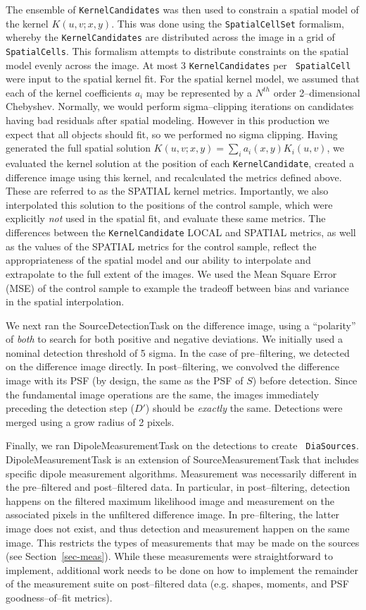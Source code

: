 \documentclass[prd, nofootinbib, floatfix, 11pt,tightenlines,times]{article}
\begin{document}
The ensemble of {\tt KernelCandidates} was then used to constrain a
spatial model of the kernel $K(u,v;x,y)$.  This was done using the
{\tt SpatialCellSet} formalism, whereby the {\tt KernelCandidates} are
distributed across the image in a grid of {\tt SpatialCells}.  This
formalism attempts to distribute constraints on the spatial model
evenly across the image.  At most 3 {\tt KernelCandidates} per {\tt
  SpatialCell} were input to the spatial kernel fit.  For the spatial
kernel model, we assumed that each of the kernel coefficients $a_i$
may be represented by a $N^{th}$ order 2--dimensional Chebyshev.
Normally, we would perform sigma--clipping iterations on candidates
having bad residuals after spatial modeling.  However in this
production we expect that all objects should fit, so we performed no
sigma clipping.  Having generated the full spatial solution
$K(u,v;x,y) = \sum_i a_i(x,y) K_i(u,v)$, we evaluated the kernel
solution at the position of each {\tt KernelCandidate}, created a
difference image using this kernel, and recalculated the metrics
defined above.  These are referred to as the SPATIAL kernel metrics.
Importantly, we also interpolated this solution to the positions of
the control sample, which were explicitly {\it not} used in the
spatial fit, and evaluate these same metrics.  The differences between
the {\tt KernelCandidate} LOCAL and SPATIAL metrics, as well as the
values of the SPATIAL metrics for the control sample, reflect the
appropriateness of the spatial model and our ability to interpolate
and extrapolate to the full extent of the images.  We used the Mean
Square Error (MSE) of the control sample to example the tradeoff
between bias and variance in the spatial interpolation.

We next ran the SourceDetectionTask on the difference image, using a
``polarity'' of {\it both} to search for both positive and negative
deviations.  We initially used a nominal detection threshold of 5
sigma.  In the case of pre--filtering, we detected on the difference
image directly.  In post--filtering, we convolved the difference
image with its PSF (by design, the same as the PSF of $S$) before
detection.  Since the fundamental image operations are the same, the images immediately preceding the
detection step ($D'$) should be {\it exactly} the same.  Detections
were merged using a grow radius of 2 pixels.

Finally, we ran DipoleMeasurementTask on the detections to create {\tt
  DiaSources}.  DipoleMeasurementTask is an extension of
SourceMeasurementTask that includes specific dipole measurement
algorithms.  Measurement was necessarily different in the
pre--filtered and post--filtered data.  In particular, in
post--filtering, detection happens on the filtered maximum likelihood
image and measurement on the associated pixels in the unfiltered
difference image.  In pre--filtering, the latter image does not exist,
and thus detection and measurement happen on the same image.  This
restricts the types of measurements that may be made on the sources
(see Section~\ref{sec-meas}).  While these measurements were
straightforward to implement, additional work needs to be done on how
to implement the remainder of the measurement suite on post--filtered
data (e.g. shapes, moments, and PSF goodness--of--fit metrics).
\end{document}
